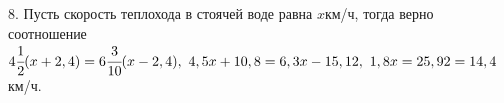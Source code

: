 8. Пусть скорость теплохода в стоячей воде равна $x$км/ч, тогда верно соотношение $4\cfrac{1}{2}(x+2,4)=6\cfrac{3}{10}(x-2,4),\ 4,5x+10,8=6,3x-15,12,\
1,8x=25,92=14,4$км/ч.\\
